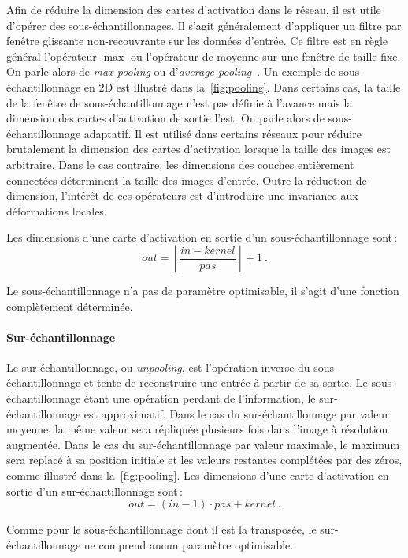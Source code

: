 Afin de réduire la dimension des cartes d'activation dans le réseau, il est utile d'opérer des sous-échantillonnages. Il s'agit généralement d'appliquer un filtre par fenêtre glissante non-recouvrante sur les données d'entrée. Ce filtre est en règle général l'opérateur $\max$ ou l'opérateur de moyenne sur une fenêtre de taille fixe. On parle alors de \emph{max pooling} ou d'\emph{average pooling}~\cite{zhou_stereo_1988}. Un exemple de sous-échantillonnage en 2D est illustré dans la~\cref{fig:pooling}. Dans certains cas, la taille de la fenêtre de sous-échantillonnage n'est pas définie à l'avance mais la dimension des cartes d'activation de sortie l'est. On parle alors de sous-échantillonnage adaptatif. Il est utilisé dans certains réseaux pour réduire brutalement la dimension des cartes d'activation lorsque la taille des images est arbitraire. Dans le cas contraire, les dimensions des couches entièrement connectées déterminent la taille des images d'entrée. Outre la réduction de dimension, l'intérêt de ces opérateurs est d'introduire une invariance aux déformations locales.

Les dimensions d'une carte d'activation en sortie d'un sous-échantillonnage sont\,:
$$\mathit{out} = \left\lfloor \frac{\mathit{in} - \mathit{kernel}}{\mathit{pas}}\right\rfloor + 1~.$$

Le sous-échantillonnage n'a pas de paramètre optimisable, il s'agit d'une fonction complètement déterminée.

\paragraph{Sur-échantillonnage}

Le sur-échantillonnage, ou \emph{unpooling}, est l'opération inverse du sous-échantillonnage et tente de reconstruire une entrée à partir de sa sortie. Le sous-échantillonnage étant une opération perdant de l'information, le sur-échantillonnage est approximatif. Dans le cas du sur-échantillonnage par valeur moyenne, la même valeur sera répliquée plusieurs fois dans l'image à résolution augmentée. Dans le cas du sur-échantillonnage par valeur maximale, le maximum sera replacé à sa position initiale et les valeurs restantes complétées par des zéros, comme illustré dans la~\cref{fig:pooling}.
Les dimensions d'une carte d'activation en sortie d'un sur-échantillonnage sont\,:
$$\mathit{out} = (\mathit{in} - 1) \cdot \mathit{pas} + \mathit{kernel}~.$$

Comme pour le sous-échantillonnage dont il est la transposée, le sur-échantillonnage ne comprend aucun paramètre optimisable.

